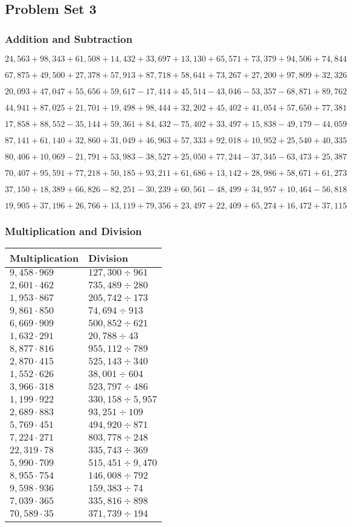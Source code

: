 \hypertarget{problem-set-3-4}{%
\subsection{Problem Set 3}\label{problem-set-3-4}}

\hypertarget{addition-and-subtraction-225}{%
\subsubsection{Addition and
Subtraction}\label{addition-and-subtraction-225}}

\(24,563+98,343+61,508+14,432+33,697+13,130+65,571+73,379+94,506+ 74,844\)

\(67,875+49,500+27,378+57,913+87,718+58,641+73,267+27,200+97,809+32,326\)

\(20,093+47,047+55,656+59,617-17,414+45,514-43,046-53,357-68,871+89,762\)

\(44,941+87,025+21,701+19,498+98,444+32,202+45,402+41,054+57,650+77,381\)

\(17,858+88,552-35,144+59,361+84,432-75,402+33,497+15,838-49,179-44,059\)

\(87,141+61,140+32,860+31,049+46,963+57,333+92,018+10,952+25,540+40,335\)

\(80,406+10,069-21,791+53,983-38,527+25,050+77,244-37,345-63,473+25,387\)

\(70,407+95,591+77,218+50,185+93,211+61,686+13,142+28,986+58,671+61,273\)

\(37,150+18,389+66,826-82,251-30,239+60,561-48,499+34,957+10,464-56,818\)

\(19,905+37,196+26,766+13,119+79,356+23,497+22,409+65,274+16,472+37,115\)

\hypertarget{multiplication-and-division-224}{%
\subsubsection{Multiplication and
Division}\label{multiplication-and-division-224}}

\begin{longtable}[]{@{}ll@{}}
\toprule
Multiplication & Division\tabularnewline
\midrule
\endhead
\(9,458\cdot969\) & \(127,300÷961\)\tabularnewline
\(2,601\cdot462\) & \(735,489÷280\)\tabularnewline
\(1,953\cdot867\) & \(205,742÷173\)\tabularnewline
\(9,861\cdot850\) & \(74,694÷913\)\tabularnewline
\(6,669\cdot909\) & \(500,852÷621\)\tabularnewline
\(1,632\cdot291\) & \(20,788÷43\)\tabularnewline
\(8,877\cdot816\) & \(955,112÷789\)\tabularnewline
\(2,870\cdot415\) & \(525,143÷340\)\tabularnewline
\(1,552\cdot626\) & \(38,001÷604\)\tabularnewline
\(3,966\cdot318\) & \(523,797÷486\)\tabularnewline
\(1,199\cdot922\) & \(330,158÷5,957\)\tabularnewline
\(2,689\cdot883\) & \(93,251÷109\)\tabularnewline
\(5,769\cdot451\) & \(494,920÷871\)\tabularnewline
\(7,224\cdot271\) & \(803,778÷248\)\tabularnewline
\(22,319\cdot78\) & \(335,743÷369\)\tabularnewline
\(5,990\cdot709\) & \(515,451÷9,470\)\tabularnewline
\(8,955\cdot754\) & \(146,008÷792\)\tabularnewline
\(9,598\cdot936\) & \(159,383÷74\)\tabularnewline
\(7,039\cdot365\) & \(335,816÷898\)\tabularnewline
\(70,589\cdot35\) & \(371,739÷194\)\tabularnewline
\bottomrule
\end{longtable}

